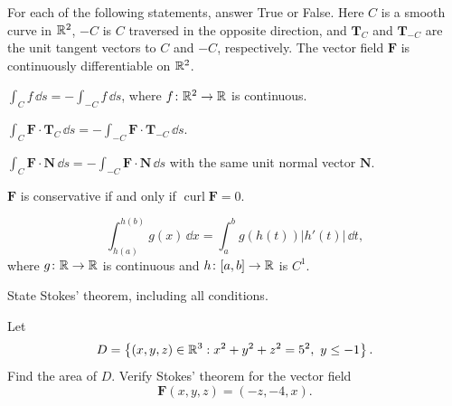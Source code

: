 \begin{problem}
For each of the following statements, answer True or False. Here $C$ is a smooth curve in $\mathbb{R}^2$, $-C$ is $C$ traversed in the opposite direction, and $\mathbf T_C$ and $\mathbf T_{-C}$ are the unit tangent vectors to $C$ and $-C$, respectively. The vector field $\mathbf F$ is continuously differentiable on $\mathbb{R}^2$.
\begin{problemchoices}
\item $\displaystyle\int_C f\,\dd s=-\int_{-C}f\,\dd s$, where $f\colon\mathbb{R}^2\to\mathbb{R}$ is continuous.
\item $\displaystyle\int_C\mathbf F\cdot\mathbf T_C\,\dd s=-\int_{-C}\mathbf F\cdot\mathbf T_{-C}\,\dd s$.
\item $\displaystyle\int_C\mathbf F\cdot\mathbf N\,\dd s=-\int_{-C}\mathbf F\cdot\mathbf N\,\dd s$ with the same unit normal vector $\mathbf N$.
\item $\mathbf F$ is conservative if and only if $\operatorname{curl}\mathbf F=0$.
\item
\[
\int_{h(a)}^{h(b)}g(x)\,\dd x
=
\int_a^b g(h(t))|h'(t)|\,\dd t,
\]
where $g\colon\mathbb{R}\to\mathbb{R}$ is continuous and $h\colon[a,b]\to\mathbb{R}$ is $C^1$.
\end{problemchoices}
\end{problem}

\begin{problem}
\begin{problemsubparts}
\item State Stokes' theorem, including all conditions.
\item Let
\[
D=\left\{(x,y,z)\in\R^3:x^2+y^2+z^2=5^2,\ y\le-1\right\}.
\]
Find the area of $D$. Verify Stokes' theorem for the vector field
\[
\mathbf F(x,y,z)=(-z,-4,x).
\]
\end{problemsubparts}
\end{problem}

